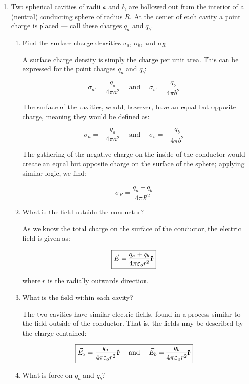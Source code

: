 \begin{enumerate}
  \item Two spherical cavities of radii $a$ and $b$, are hollowed out from the interior of a (neutral) conducting sphere of radius $R$.  At the center of each cavity a point charge is placed — call these charges $q_a$ and $q_b$.

    \begin{enumerate}

      \item Find the surface charge densities $\sigma_a$, $\sigma_b$, and $\sigma_R$

        A surface charge density is simply the charge per unit area. This can be expressed for \underline{the point charges} $q_a$ and $q_b$:

        $$\sigma_{a'}=\frac{q_a}{4\pi a^2}\quad\text{ and }\quad\sigma_{b'}=\frac{q_b}{4\pi b^2}$$

        The surface of the cavities, would, however, have an equal but opposite charge, meaning they would be defined as:

        $$\boxed{\sigma_a=-\frac{q_a}{4\pi a^2}\quad\text{ and }\quad\sigma_b=-\frac{q_b}{4\pi b^2}}$$

        The gathering of the negative charge on the inside of the conductor would create an equal but opposite charge on the surface of the sphere; applying similar logic, we find:

        $$\boxed{\sigma_R=\frac{q_a+q_b}{4\pi R^2}}$$

      \item What is the field outside the conductor?

        As we know the total charge on the surface of the conductor, the electric field is given as:

        $$\boxed{\vec{E}=\frac{q_a+q_b}{4\pi\varepsilon_o r^2}\bold{\hat{r}}}$$

        where $r$ is the radially outwards direction.

      \item What is the field within each cavity?

        The two cavities have similar electric fields, found in a process similar to the field outside of the conductor. That is, the fields may be described by the charge contained:

        $$\boxed{\vec{E}_a=\frac{q_a}{4\pi\varepsilon_o r^2}\bold{\hat{r}}\quad\text{ and }\quad\vec{E}_b=\frac{q_b}{4\pi\varepsilon_o r^2}\bold{\hat{r}}}$$

      \item What is force on $q_a$ and $q_b$?


\end{enumerate}
\end{enumerate}

